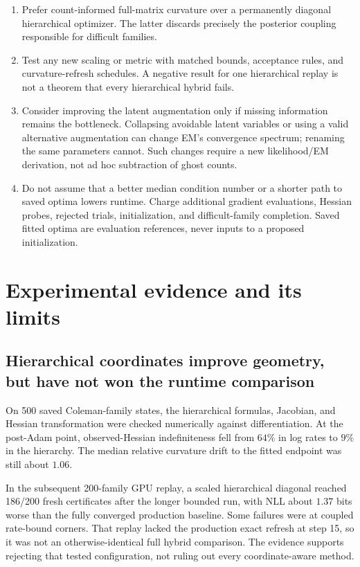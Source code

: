 \documentclass[11pt]{article}
\begin{document}
\begin{enumerate}
 \item Prefer count-informed full-matrix curvature over a permanently diagonal
       hierarchical optimizer. The latter discards precisely the posterior
       coupling responsible for difficult families.
 \item Test any new scaling or metric with matched bounds, acceptance rules,
       and curvature-refresh schedules. A negative result for one hierarchical
       replay is not a theorem that every hierarchical hybrid fails.
 \item Consider improving the latent augmentation only if missing information
       remains the bottleneck. Collapsing avoidable latent variables or using a
       valid alternative augmentation can change EM's convergence spectrum;
       renaming the same parameters cannot. Such changes require a new
       likelihood/EM derivation, not ad hoc subtraction of ghost counts.
 \item Do not assume that a better median condition number or a shorter path
       to saved optima lowers runtime. Charge additional gradient evaluations,
       Hessian probes, rejected trials, initialization, and difficult-family
       completion. Saved fitted optima are evaluation references, never inputs
       to a proposed initialization.
\end{enumerate}

\section{Experimental evidence and its limits}

\subsection{Hierarchical coordinates improve geometry, but have not won the runtime comparison}

On 500 saved Coleman-family states, the hierarchical formulas, Jacobian, and
Hessian transformation were checked numerically against differentiation. At the
post-Adam point, observed-Hessian indefiniteness fell from $64\%$ in log rates
to $9\%$ in the hierarchy. The median relative curvature drift to the fitted
endpoint was still about $1.06$.

In the subsequent 200-family GPU replay, a scaled hierarchical diagonal reached
186/200 fresh certificates after the longer bounded run, with NLL about
$1.37$ bits worse than the fully converged production baseline. Some failures
were at coupled rate-bound corners. That replay lacked the production exact
refresh at step 15, so it was not an otherwise-identical full hybrid comparison.
The evidence supports rejecting that tested configuration, not ruling out every
coordinate-aware method.
\end{document}
